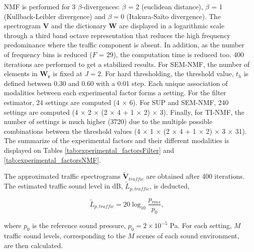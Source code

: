 \documentclass[review,5p,twocolumn,sort&compress,times]{elsarticle}
\begin{document}
NMF is performed for 3 $\beta$-divergences: $\beta$ = 2 (euclidean distance), $\beta$ = 1 (Kullback-Leibler divergence) and $\beta = 0$ (Itakura-Sa\"ito divergence). The spectrogram $\mathbf{V}$ and the dictionary $\mathbf{W}$ are displayed in a logarithmic scale through a third band octave representation that reduces the high frequency predominance where the traffic component is absent. In addition, as the number of frequency bins is reduced ($F$ = 29), the computation time is reduced too. 400 iterations are performed to get a stabilized results. For SEM-NMF, the number of elements in $\mathbf{W_r}$ is fixed at $J = 2$. For hard thresholding, the threshold value, $t_h$ is defined between 0.30 and 0.60 with a 0.01 step. 
Each unique association of modalities between each experimental factor forms a setting. For the filter estimator, 24 settings are computed (4 $\times$ 6). For SUP and SEM-NMF, 240 settings are computed (4 $\times$ 2 $\times$ (2 $\times$ 4 + 1 $\times$ 2) $\times$ 3). Finally, for TI-NMF, the number of settings is much higher (3720) due to the multiple possible combinations between the threshold values (4 $\times$ 1 $\times$ (2 $\times$ 4 + 1 $\times$ 2) $\times$ 3 $\times$ 31).
The summarize of the experimental factors and their different modalities is displayed on Tables \ref{tab:experimental_factorsFilter} and \ref{tab:experimental_factorsNMF}. 

The approximated traffic spectrograms $\mathbf{\tilde{V}}_{traffic}$ are obtained after 400 iterations. The estimated traffic sound level in dB, $\tilde{L}_{p, traffic}$, is deducted, 

\begin{equation}
\tilde{L}_{p, traffic} = 20\log_{10}\frac{p_{rms}}{p_0}, 
\end{equation}

where $p_0$ is the reference sound pressure, $p_0 = 2\times 10^{-5}$ Pa. For each setting, $M$ traffic sound levels, corresponding to the $M$ scenes of each sound environment, are then calculated. 
\end{document}
